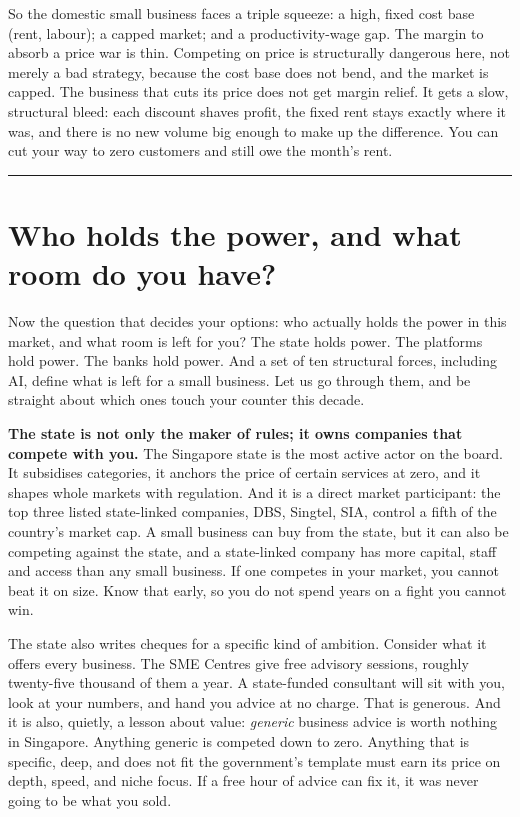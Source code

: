 \documentclass[10pt,twoside,openany]{memoir}
\begin{document}
{{{{{{{{{{So the domestic small business faces a triple squeeze: a high, fixed
cost base (rent, labour); a capped market; and a productivity-wage gap.
The margin to absorb a price war is thin. Competing on price is
structurally dangerous here, not merely a bad strategy, because the cost
base does not bend, and the market is capped. The business that cuts its
price does not get margin relief. It gets a slow, structural bleed: each
discount shaves profit, the fixed rent stays exactly where it was, and
there is no new volume big enough to make up the difference. You can cut
your way to zero customers and still owe the month's rent.

\begin{center}\rule{0.5\linewidth}{0.5pt}\end{center}

\FloatBarrier
\chapter{Who holds the power, and what room do you
have?}\label{who-holds-the-power-and-what-room-do-you-have}

Now the question that decides your options: who actually holds the power
in this market, and what room is left for you? The state holds power.
The platforms hold power. The banks hold power. And a set of ten
structural forces, including AI, define what is left for a small
business. Let us go through them, and be straight about which ones touch
your counter this decade.

\textbf{The state is not only the maker of rules; it owns companies that
compete with you.} The Singapore state is the most active actor on the
board. It subsidises categories, it anchors the price of certain
services at zero, and it shapes whole markets with regulation. And it is
a direct market participant: the top three listed state-linked
companies, DBS, Singtel, SIA, control a fifth of the country's market
cap. A small business can buy from the state, but it can also be
competing against the state, and a state-linked company has more
capital, staff and access than any small business. If one competes in
your market, you cannot beat it on size. Know that early, so you do not
spend years on a fight you cannot win.

The state also writes cheques for a specific kind of ambition. Consider
what it offers every business. The SME Centres give free advisory
sessions, roughly twenty-five thousand of them a year. A state-funded
consultant will sit with you, look at your numbers, and hand you advice
at no charge. That is generous. And it is also, quietly, a lesson about
value: \emph{generic} business advice is worth nothing in Singapore.
Anything generic is competed down to zero. Anything that is specific,
deep, and does not fit the government's template must earn its price on
depth, speed, and niche focus. If a free hour of advice can fix it, it
was never going to be what you sold.

}}}}}}}}}}
\end{document}
